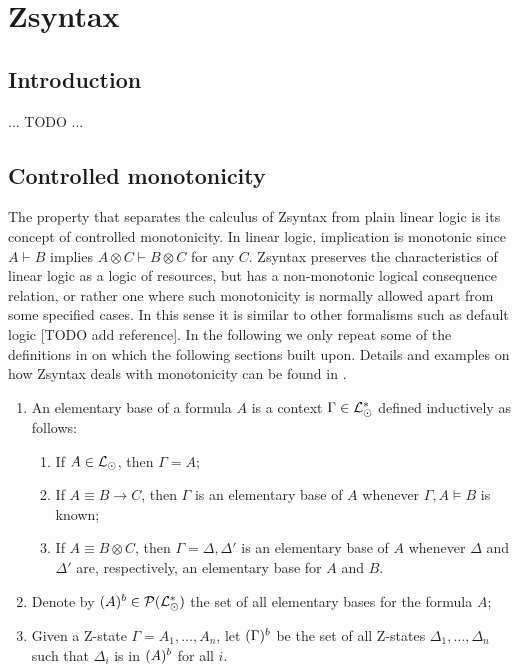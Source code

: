 \section{Zsyntax}\label{sec:zsyntax}

\subsection{Introduction}

... TODO ...

\subsection{Controlled monotonicity}

The property that separates the calculus of Zsyntax from plain linear logic is
its concept of controlled monotonicity. In linear logic, implication is
monotonic since $A \vdash B$ implies $A \otimes C \vdash B \otimes C$ for any
$C$. Zsyntax preserves the characteristics of linear logic as a logic of
resources, but has a non-monotonic logical consequence relation, or rather one
where such monotonicity is normally allowed apart from some specified cases. In
this sense it is similar to other formalisms such as default logic [TODO add
reference]. In the following we only repeat some of the definitions in
\cite{adding-logic} on which the following sections built upon. Details and
examples on how Zsyntax deals with monotonicity can be found in
\cite{adding-logic}.

\begin{definition}
  \begin{enumerate}
  \item An elementary base of a formula $A$ is a context
    $\Gamma \in \mathcal{L}_{\odot}^*$ defined inductively as follows:

    \begin{enumerate}
    \item If $A \in \mathcal{L}_{\odot}$, then $\Gamma = A$;
    \item If $A \equiv B \rightarrow C$, then $\Gamma$ is an elementary base of
      $A$ whenever $\Gamma, A \models B$ is known;
    \item If $A \equiv B \otimes C$, then $\Gamma = \Delta, \Delta'$ is an
      elementary base of $A$ whenever $\Delta$ and $\Delta'$ are, respectively,
      an elementary base for $A$ and $B$.
    \end{enumerate}

  \item Denote by $(A)^{b} \in \mathcal{P}(\mathcal{L}_{\odot}^*)$ the set of all
    elementary bases for the formula $A$;
  \item Given a Z-state $\Gamma = A_1, \dots, A_n$, let $(\Gamma)^{b}$ be
    the set of all Z-states $\Delta_1, \dots, \Delta_n$ such that $\Delta_i$ is
    in $(A)^{b}$ for all $i$.
  \end{enumerate}
\end{definition}

